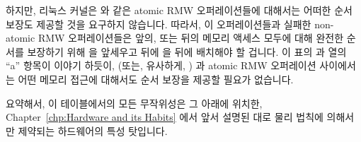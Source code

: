 {	하지만, 리눅스 커널은  와 같은  atomic RMW
	오퍼레이션들에 대해서는 어떠한 순서 보장도 제공할 것을 요구하지
	않습니다.
	따라서, 이 오퍼레이션들과 실패한 non- atomic RMW
	오퍼레이션들은 앞의, 또는 뒤의 메모리 액세스 모두에 대해 완전한 순서를
	보장하기 위해  을 앞세우고 뒤에
	 을 뒤에 배치해야 할 겁니다.
	이 표의  과 
	열의 ``a'' 항목이 이야기 하듯이,  (또는,
	유사하게, ) 과 atomic RMW 오퍼레이션
	사이에서는 어떤 메모리 접근에 대해서도 순서 보장을 제공할 필요가
	없습니다.

	요약해서, 이 테이블에서의 모든 무작위성은 그 아래에 위치한,
	Chapter~\ref{chp:Hardware and its Habits} 에서 앞서 설명된 대로 물리
	법칙에 의해서만 제약되는 하드웨어의 특성 탓입니다.

} \QuickQuizEnd

